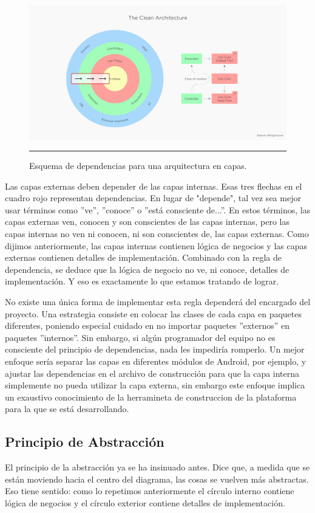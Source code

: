 \begin{figure}[htbp]
	\centering
	\includegraphics[width=1\textwidth]{Figures/-001.png}
	\rule{35em}{1pt}
	\caption[Principio de Dependecias]{Esquema de dependencias para una arquitectura en capas.}
	\label{fig:Diagrama_clasico}
\end{figure}


Las capas externas deben depender de las capas internas. Esas tres flechas en el cuadro rojo representan dependencias. En lugar de "depende", tal vez sea mejor usar términos como ''ve'', ''conoce'' o ''está consciente de...''. En estos términos, las capas externas ven, conocen y son conscientes de las capas internas, pero las capas internas no ven ni conocen, ni son conscientes de, las capas externas. Como dijimos anteriormente, las capas internas contienen lógica de negocios y las capas externas contienen detalles de implementación. Combinado con la regla de dependencia, se deduce que la lógica de negocio no ve, ni conoce, detalles de implementación. Y eso es exactamente lo que estamos tratando de lograr.

No existe una única forma de implementar esta regla dependerá del encargado del proyecto. Una estrategia consiste en colocar las clases de cada capa en paquetes diferentes, poniendo especial cuidado en no importar paquetes ''externos'' en paquetes ''internos''. Sin embargo, si algún programador del equipo no es consciente del principio de dependencias, nada les impediría romperlo. Un mejor enfoque sería separar las capas en diferentes módulos de Android, por ejemplo, y ajustar las dependencias en el archivo de construcción para que la capa interna simplemente no pueda utilizar la capa externa, sin embargo este enfoque implica un exaustivo conocimiento de la herramineta de construccion de la plataforma para la que se está desarrollando.

\subsection{Principio de Abstracción}
El principio de la abstracción ya se ha insinuado antes. Dice que, a medida que se están moviendo hacia el centro del diagrama, las cosas se vuelven más abstractas. Eso tiene sentido: como lo repetimos anteriormente el círculo interno contiene lógica de negocios y el círculo exterior contiene detalles de implementación.

